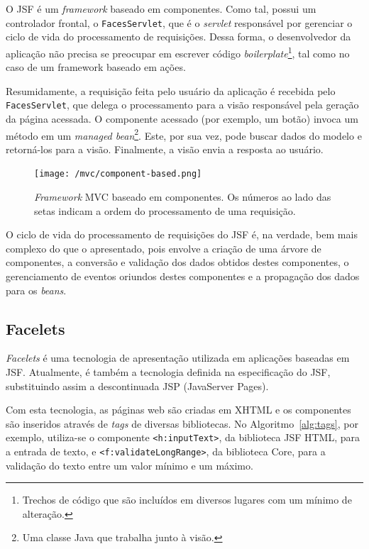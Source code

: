 \documentclass[
  10.5pt,				  %
	openright,			%
	twoside,			  %
  a5paper,
  chapter=TITLE,	%
	section=TITLE,	%
  hyphens,        %
	english,        %
	brazil          %
]{abntex2}
\begin{document}
O JSF é um \emph{framework} baseado em componentes. Como tal, possui um controlador frontal, o \texttt{FacesServlet}, que é o \emph{servlet} responsável por gerenciar o ciclo de vida do processamento de requisições. Dessa forma, o desenvolvedor da aplicação não precisa se preocupar em escrever código \emph{boilerplate}\footnote{Trechos de código que são incluídos em diversos lugares com um mínimo de alteração.}, tal como no caso de um framework baseado em ações.

Resumidamente, a requisição feita pelo usuário da aplicação é recebida pelo \texttt{FacesServlet}, que delega o processamento para a visão responsável pela geração da página acessada. O componente acessado (por exemplo, um botão) invoca um método em um \emph{managed bean}\footnote{Uma classe Java que trabalha junto à visão.}. Este, por sua vez, pode buscar dados do modelo e retorná-los para a visão. Finalmente, a visão envia a resposta ao usuário.

\begin{figure}[!ht]
  \caption{\label{fig:mvc-pull}\emph{Framework} MVC baseado em componentes. Os números ao lado das setas indicam a ordem do processamento de uma requisição.}
  \begin{center}
    \texttt{[image: /mvc/component-based.png]}
  \end{center}
\end{figure}

O ciclo de vida do processamento de requisições do JSF é, na verdade, bem mais complexo do que o apresentado, pois envolve a criação de uma árvore de componentes, a conversão e validação dos dados obtidos destes componentes, o gerenciamento de eventos oriundos destes componentes e a propagação dos dados para os \emph{beans}.



\subsection{Facelets}\label{sec:facelets}
\emph{Facelets} é uma tecnologia de apresentação utilizada em aplicações baseadas em JSF. Atualmente, é também a tecnologia definida na especificação do JSF, substituindo assim a descontinuada JSP (JavaServer Pages).

Com esta tecnologia, as páginas web são criadas em XHTML e os componentes são inseridos através de \emph{tags} de diversas bibliotecas. No Algoritmo~\ref{alg:tags}, por exemplo, utiliza-se o componente \texttt{<h:inputText>}, da biblioteca JSF HTML, para a entrada de texto, e \texttt{<f:validateLongRange>}, da biblioteca Core, para a validação do texto entre um valor mínimo e um máximo.
\end{document}
